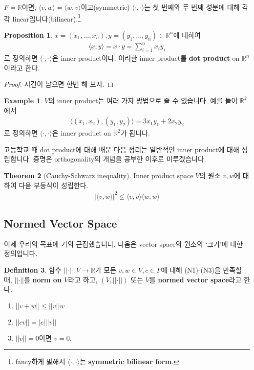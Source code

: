 \documentclass[12pt]{article}
\theoremstyle{definition}
\newtheorem{thm}{Theorem}[section]
\newtheorem{prop}[thm]{Proposition}
\newtheorem{defn}[thm]{Definition}
\newtheorem*{ex}{Example}
\def\RR{\mathbb{R}}
\newcommand{\abs}[1]{\left\vert#1\right\vert}
\newcommand{\norm}[1]{\left\vert\left\vert#1\right\vert\right\vert}
\newcommand{\inner}[2]{\langle #1, #2\rangle}
\begin{document}
\(F=\RR\)이면, \(\inner{v}{w} = \inner{w}{v}\)이고(symmetric) \(\inner{\cdot}{\cdot}\)는 첫 번째와 두 번째 성분에 대해 각각 linear입니다(bilinear).\footnote {fancy하게 말해서 \(\inner{\cdot}{\cdot}\)는 \textbf{symmetric bilinear form}.}

	\begin{prop}
		\(x = (x_1, \ldots, x_n), y = (y_1, \ldots, y_n) \in \RR^n\)에 대하여
		\begin{gather*}
			\inner{x}{y} = x \cdot y = \sum_{i=1}^n x_i y_i
		\end{gather*}
		로 정의하면 \(\inner{\cdot}{\cdot}\)은 inner product이다. 이러한 inner product를 \textbf{dot product} on \(\RR^n\)이라고 한다.
	\end{prop}
	\begin{proof}
		시간이 남으면 한번 해 보자.
	\end{proof}

	\begin{ex}
		\(V\)의 inner product는 여러 가지 방법으로 줄 수 있습니다. 예를 들어 \(\RR^2\)에서
		\begin{gather*}
			\inner{(x_1, x_2)}{(y_1, y_2)} = 3x_1 y_1 + 2x_2 y_2
		\end{gather*}
		로 정의하면 \(\inner{\cdot}{\cdot}\)은 inner product on \(\RR^2\)가 됩니다.
	\end{ex}

고등학교 때 dot product에 대해 배운 다음 정리는 일반적인 inner product에 대해 성립합니다. 증명은 orthogonality의 개념을 공부한 이후로 미루겠습니다.

	\begin{thm}[Cauchy-Schwarz inequality]
		Inner product space \(V\)의 원소 \(v, w\)에 대하여 다음 부등식이 성립한다.
		\begin{gather*}
			\abs{\inner{v}{w}}^2 \le \inner{v}{v}\inner{w}{w}
		\end{gather*}
	\end{thm}

\subsection{Normed Vector Space}
이제 우리의 목표에 거의 근접했습니다. 다음은 vector space의 원소의 `크기'에 대한 정의입니다.

	\begin{defn}
		함수 \(\norm{\cdot}: V \rightarrow \mathbb{R}\)가 모든 \(v, w \in V, c \in F\)에 대해 (N1)-(N3)을 만족할 때, \(\norm{\cdot}\)를 \textbf{norm on \(V\)}라고 하고, \((V, \norm{\cdot})\) 또는 \(V\)를 \textbf{normed vector space}라고 한다.
		\begin{enumerate}[label=(N\arabic*), leftmargin=2\parindent]
			\item
			\(\norm{v+w} \le \norm{v}{w}\)
			\item
			\(\norm{cv} = \abs{c}\norm{v}\)
			\item
			\(\norm{v}=0\)이면 \(v=0\).
		\end{enumerate}
	\end{defn}
	
\end{document}
